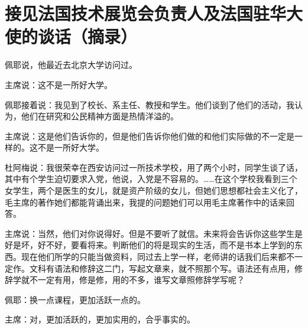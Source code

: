 \section[接见法国技术展览会负责人及法国驻华大使的谈话（摘录）（一九六四年九月十日）]{接见法国技术展览会负责人及法国驻华大使的谈话（摘录）}


佩耶说，他最近去北京大学访问过。

主席说：这不是一所好大学。

佩耶接着说：我见到了校长、系主任、教授和学生。他们谈到了他们的活动，我认为，他们在研究和公民精神方面是热情洋溢的。

主席说：这是他们告诉你的，但是他们告诉你他们做的和他们实际做的不一定是一样的。这不是一所好大学。

杜阿梅说：我很荣幸在西安访问过一所技术学校，用了两个小时，同学生谈了话，其中有个学生迫切要求入党，他说，入党是不容易的。……在这个学校我看到三个女学生，两个是医生的女儿，就是资产阶级的女儿，但她们思想都社会主义化了，毛主席的著作她们都能背诵出来，我提的问题她们可以用毛主席著作中的话来回答。

主席说：当然，他们对你说得好。但是不要听了就信。未来将会告诉你这些学生是好是坏，好不好，要看将来。判断他们的将是现实的生活，而不是书本上学到的东西。现在他们所学的只能当做资料，同过去上学一样，老师讲的话我们后来都不一定作。文科有语法和修辞这二门，写起文章来，就不照那个写。语法还有点用，修辞学就不一定有用，修是修，用的不多，谁写文章照修辞学写呢？

佩耶：换一点课程，更加活跃一点的。

主席：对，更加活跃的，更加实用的，合乎事实的。


